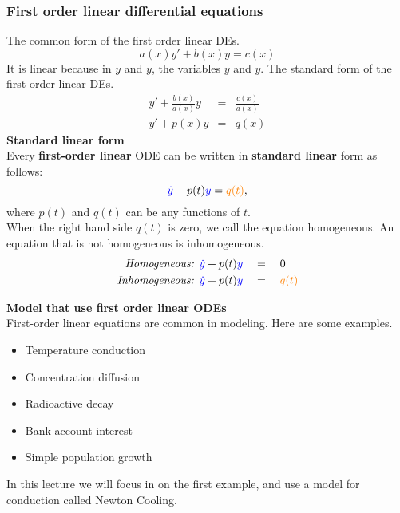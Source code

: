 \subsubsection{First order linear differential equations}
The common form of the first order linear DEs. 
\begin{equation*}
  a(x) y' + b(x) y = c(x)
\end{equation*}
It is linear because in $y$ and $\dot y$, the variables $y$ and $\dot y$.
The standard form of the first order linear DEs.
\begin{eqnarray*}
  y' + \frac{b(x)}{a(x)} y &=& \frac{c(x)}{a(x)} \\
  y' + p(x) y &=& q(x) 
\end{eqnarray*}
\textbf{\color{blue} Standard linear form}\\
Every \textbf{first-order linear} ODE can be written in \textbf{\color{blue}standard linear} form as follows:
\begin{equation*}
  {\color{blue} \dot  y} + p(t) {\color{blue} y} = {\color{orange} q(t)},  
\end{equation*}
where $p(t)$ and $q(t)$ can be any functions of $t$.\\
When the right hand side $q(t)$ is zero, we call the equation {\color{blue}homogeneous}.
An equation that is not homogeneous is {\color{blue}inhomogeneous}.
\begin{align*}
  \text{\textit{Homogeneous: }} &{\color{blue} \dot  y} + p(t) {\color{blue} y} \quad = \quad 0 \\
  \text{\textit{Inhomogeneous: }} &{\color{blue} \dot  y} + p(t) {\color{blue} y} \quad =
                                    \quad {\color{orange} q(t)}
\end{align*}

\textbf{Model that use first order linear ODEs}\\
First-order linear equations are common in modeling. Here are some examples.
\begin{itemize}
\item Temperature conduction
\item Concentration diffusion
\item Radioactive decay
\item Bank account interest
\item Simple population growth
\end{itemize}
In this lecture we will focus in on the first example, and use a model for conduction called Newton Cooling.

